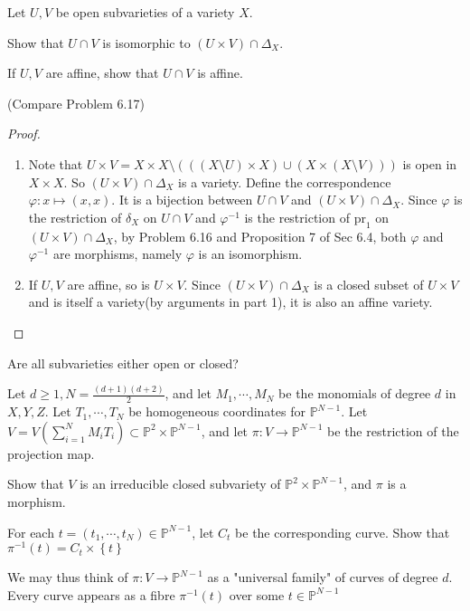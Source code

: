 \documentclass{solution}
\begin{document}
\begin{problem}{6.27}
    Let $U, V$ be open subvarieties of a variety $X$. \begin{inparaenum}
        \item Show that $U \cap V$ is isomorphic to $(U \times V) \cap \Delta_X$.
        \item If $U, V$ are affine, show that $U \cap V$ is affine.
    \end{inparaenum}
    (Compare Problem 6.17)
\end{problem}

\begin{proof}
    \begin{enumerate}
        \item Note that $U \times V = X \times X \setminus (((X \setminus U) \times X) \cup (X \times (X \setminus V)))$ is open in $X \times X$. So $(U \times V) \cap \Delta_X$ is a variety. Define the correspondence $\varphi: x \mapsto (x, x)$. It is a bijection between $U \cap V$ and $(U \times V) \cap \Delta_X$. Since $\varphi$ is the restriction of $\delta_X$ on $U \cap V$ and $\varphi ^{-1}$ is the restriction of $\textrm{pr}_1$ on $(U \times V) \cap \Delta_X$, by Problem 6.16 and Proposition 7 of Sec 6.4, both $\varphi$ and $\varphi ^{-1}$ are morphisms, namely $\varphi$ is an isomorphism.
        \item If $U, V$ are affine, so is $U \times V$. Since $(U \times V) \cap \Delta_X$ is a closed subset of $U \times V$ and is itself a variety(by arguments in part 1), it is also an affine variety.
    \end{enumerate}
\end{proof}

{\color{red} Are all subvarieties either open or closed?}

\begin{problem}{6.28}
    Let $d \ge 1, N = \frac{(d + 1)(d + 2)}{2}$, and let $M_1, \cdots, M_N$ be the monomials of degree $d$ in $X, Y, Z$. Let $T_1, \cdots, T_N$ be homogeneous coordinates for $\mathbb{P}^{N - 1}$. Let $V = V(\sum\limits_{i = 1}^{N} M_iT_i) \subset \mathbb{P}^2 \times \mathbb{P}^{N - 1}$, and let $\pi: V \rightarrow \mathbb{P}^{N - 1}$ be the restriction of the projection map. \begin{inparaenum}
        \item Show that $V$ is an irreducible closed subvariety of $\mathbb{P}^2 \times \mathbb{P}^{N - 1}$, and $\pi$ is a morphism.
        \item For each $t = (t_1, \cdots, t_N) \in \mathbb{P}^{N - 1}$, let $C_t$ be the corresponding curve. Show that $\pi ^{-1}(t) = C_t \times \left\lbrace t \right\rbrace$
    \end{inparaenum}
    We may thus think of $\pi: V \rightarrow \mathbb{P}^{N - 1}$ as a "universal family" of curves of degree $d$. Every curve appears as a fibre $\pi ^{-1}(t)$ over some $t \in \mathbb{P}^{N - 1}$
\end{problem}
\end{document}
